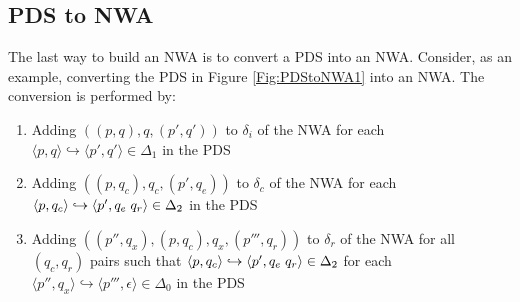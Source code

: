 \documentclass{llncs}
\begin{document}
\subsection{PDS to NWA}
\label{Se:PDStoNWA}

The last way to build an NWA is to convert a PDS into an NWA.  Consider, as an example, converting the PDS in Figure \ref{Fig:PDStoNWA1} into an NWA.  The conversion is performed by:

\begin{enumerate}

\item Adding $( (p,q), q, (p',q') )$ to $\delta_i$ of the NWA for each $\langle p,q \rangle \hookrightarrow \langle p',q' \rangle \in \Delta_1$ in the PDS

\item Adding $( (p,q_c), q_c, (p',q_e) )$ to $\delta_c$ of the NWA for each $\langle p,q_c \rangle \hookrightarrow \langle p',q_e \hspace{.1cm} q_r \rangle \in \Delta_2$ in the PDS

\item Adding $( (p'',q_x), (p,q_c), q_x, (p''',q_r) )$ to $\delta_r$ of the NWA for all $(q_c,q_r)$ pairs such that $\langle p,q_c \rangle \hookrightarrow \langle p',q_e \hspace{.1cm} q_r \rangle \in \Delta_2$ for each $\langle p'',q_x \rangle \hookrightarrow \langle p''',\epsilon \rangle \in \Delta_0$ in the PDS

\end{enumerate}
\end{document}
